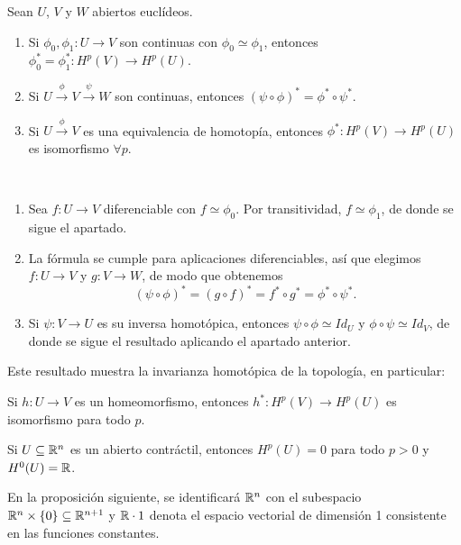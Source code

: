 \documentclass[CV.tex]{subfiles}
\begin{document}
\begin{teorema}\label{6.8}
Sean $U$, $V$ y $W$ abiertos euclídeos.
\begin{enumerate}
\item Si $\phi_0,\phi_1:U\to V$ son continuas con $\phi_0\simeq \phi_1$, entonces $\phi_0^*=\phi_1^*:H^p(V)\to H^p(U)$.
\item Si $U\overset{\phi}{\to}V\overset{\psi}{\to}W$ son continuas, entonces $(\psi\circ\phi)^*=\phi^*\circ\psi^*$.
\item Si $U\overset{\phi}{\to}V$ es una equivalencia de homotopía, entonces $\phi^*:H^p(V)\to H^p(U)$ es isomorfismo $\forall p$.
\end{enumerate}
\end{teorema}
\begin{dem}\
\begin{enumerate}
\item Sea $f:U\to V$ diferenciable con $f\simeq\phi_0$. Por transitividad, $f\simeq\phi_1$, de donde se sigue el apartado.
\item La fórmula se cumple para aplicaciones diferenciables, así que elegimos $f:U\to V$ y $g:V\to W$, de modo que obtenemos 
\[
(\psi\circ\phi)^*=(g\circ f)^*=f^*\circ g^*=\phi^*\circ\psi^*.
\]
\item Si $\psi:V\to U$ es su inversa homotópica, entonces $\psi\circ\phi\simeq Id_U$ y $\phi\circ\psi\simeq Id_V$, de donde se sigue el resultado aplicando el apartado anterior.
\end{enumerate}
\QED
\end{dem}

Este resultado muestra la invarianza homotópica de la topología, en particular:

\begin{coro} 
Si $h:U\to V$ es un homeomorfismo, entonces $h^*:H^p(V)\to H^p(U)$ es isomorfismo para todo $p$.
\end{coro}

\begin{coro}
Si $U\subseteq\mathbb{R}^n$ es un abierto contráctil, entonces $H^p(U)=0$ para todo $p>0$ y $H^0(U)=\mathbb{R}$. 
\end{coro}

En la proposición siguiente, se identificará $\mathbb{R}^n$ con el subespacio $\mathbb{R}^n\times\{0\}\subseteq\mathbb{R}^{n+1}$ y $\mathbb{R}\cdot 1$ denota el espacio vectorial de dimensión 1 consistente en las funciones constantes.
\end{document}
